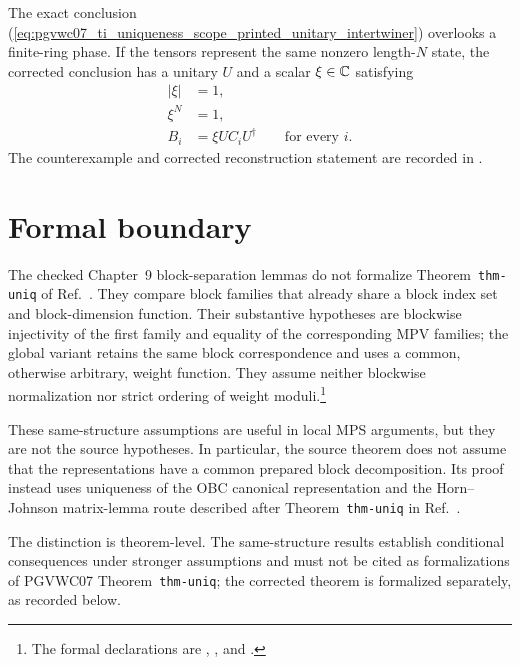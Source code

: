 \documentclass[11pt]{article}
\begin{document}
The exact conclusion
(\ref{eq:pgvwc07_ti_uniqueness_scope_printed_unitary_intertwiner}) overlooks a
finite-ring phase. If the tensors represent the same nonzero length-$N$ state,
the corrected conclusion has a unitary $U$ and a scalar $\xi\in\mathbb{C}$ satisfying
\begin{align}
    |\xi|
     & =1,
    \label{eq:pgvwc07_ti_uniqueness_scope_unit_phase} \\
    \xi^N
     & =1,
    \label{eq:pgvwc07_ti_uniqueness_scope_root_phase} \\
    B_i
     & =\xi UC_iU^\dagger
    \qquad\text{for every }i.
    \label{eq:pgvwc07_ti_uniqueness_scope_corrected_unitary_intertwiner}
\end{align}
The counterexample and corrected reconstruction statement are recorded in
.

\section{Formal boundary}

The checked Chapter~9 block-separation lemmas do not formalize
Theorem~\texttt{thm-uniq} of Ref.~\cite{PerezGarcia2007MPSReps}. They compare
block families that already share a block index set and block-dimension
function. Their substantive hypotheses are blockwise injectivity of the first
family and equality of the corresponding MPV families; the global
variant retains the same block correspondence and uses a common,
otherwise arbitrary, weight function. They assume neither blockwise
normalization nor strict ordering of weight moduli.\footnote{The formal declarations are
    ,
    , and
    .}

These same-structure assumptions are useful in local MPS arguments, but they
are not the source hypotheses. In particular, the source theorem does not
assume that the representations have a common prepared block decomposition.
Its proof instead uses
uniqueness of the OBC canonical representation and the Horn--Johnson
matrix-lemma route described after Theorem~\texttt{thm-uniq} in
Ref.~\cite{PerezGarcia2007MPSReps}.

The distinction is theorem-level. The same-structure results establish
conditional consequences under stronger assumptions and must not be cited as
formalizations of PGVWC07 Theorem~\texttt{thm-uniq}; the corrected theorem is
formalized separately, as recorded below.
\end{document}
